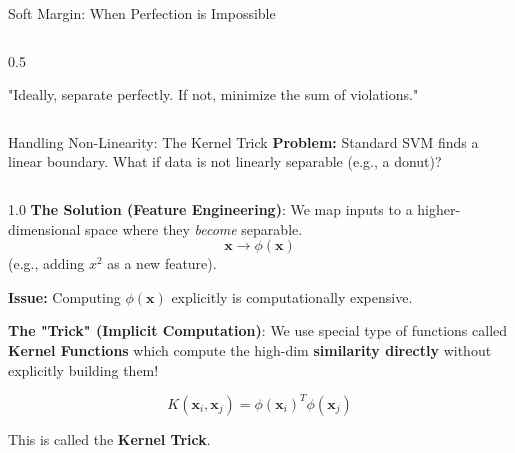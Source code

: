 \begin{frame}[allowframebreaks]{Soft Margin: When Perfection is Impossible}
\begin{columns}[c]
\begin{column}{0.5\textwidth}
            
            \vspace{0.5em}
            \small "Ideally, separate perfectly. If not, minimize the sum of violations."
        \end{column}
    \end{columns}
\end{frame}


\begin{frame}{Handling Non-Linearity: The Kernel Trick}
    \textbf{Problem:} Standard SVM finds a linear boundary. What if data is not linearly separable (e.g., a donut)?
    \pause
    
    \vspace{0.5em}
    \begin{columns}[c]
        \begin{column}{1.0\textwidth}
            \textbf{The Solution (Feature Engineering)}:
            We map inputs to a higher-dimensional space where they \textit{become} separable.
            $$ \mathbf{x} \rightarrow \phi(\mathbf{x}) $$
            (e.g., adding $x^2$ as a new feature).
            \pause
            \vspace{0.3em}

            \textbf{Issue:} Computing $\phi(\mathbf{x})$ explicitly is computationally expensive.
            \pause
            \vspace{0.3em}
            
            \textbf{The "Trick" (Implicit Computation)}:
             We use special type of functions called \textbf{Kernel Functions} which compute the high-dim \textbf{similarity directly} without explicitly building them!
            
            \begin{tcolorbox}[colback=blue!5, colframe=blue!60, boxsep=4pt]
                $$ K(\mathbf{x}_i, \mathbf{x}_j) = \phi(\mathbf{x}_i)^T \phi(\mathbf{x}_j) $$
            \end{tcolorbox}
            \small
            This is called the \textbf{Kernel Trick}.
        \end{column}

        
    \end{columns}
\end{frame}

